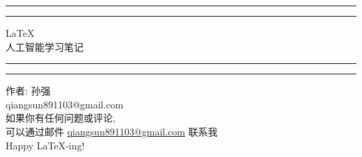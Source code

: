 \begin{titlepage}
	\centering %
	\scshape %
	\vspace*{1.5\baselineskip} %

	\rule{13cm}{1.6pt}\vspace*{-\baselineskip}\vspace*{2pt} %
	\rule{13cm}{0.4pt} %
	
		\vspace{0.75\baselineskip} %
	{	
        \Huge \LaTeX\\ 
			\vspace{4mm}
		人工智能学习笔记 \\	
    }
		\vspace{0.75\baselineskip} %
	\rule{13cm}{0.4pt}\vspace*{-\baselineskip}\vspace{3.2pt} %
	\rule{13cm}{1.6pt} %
	
		\vspace{1.75\baselineskip} %
	{\large 作者: 孙强 \\
		\vspace*{1.2\baselineskip}
	qiangsun891103@gmail.com} \\
	\vfill
如果你有任何问题或评论, \\ \vspace{1mm} 可以通过邮件 \url{qiangsun891103@gmail.com} 联系我\\ \vspace{1mm}
Happy \LaTeX-ing!

\end{titlepage}
